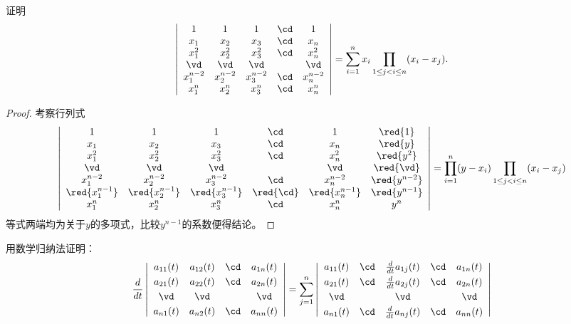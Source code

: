 \begin{li}
  证明
  $$
  \left|
    \begin{array}{ccccc}
      1&1&1&\cd&1\\
      x_1&x_2&x_3&\cd&x_n\\
      x_1^2&x_2^2&x_3^2&\cd&x_n^2\\
      \vd&\vd&\vd&&\vd\\
      x_1^{n-2}&x_2^{n-2}&x_3^{n-2}&\cd&x_n^{n-2}\\
      x_1^{n}&x_2^{n}&x_3^{n}&\cd&x_n^{n}\\
    \end{array}
  \right| = \sum_{i=1}^{n}x_i \prod_{1\le j < i \le n}(x_i-x_j).
  $$
\end{li}

\begin{proof}
考察行列式
$$
\left|
  \begin{array}{cccccc}
    1&1&1&\cd&1&\red{1}\\
    x_1&x_2&x_3&\cd&x_n&\red{y}\\
    x_1^2&x_2^2&x_3^2&\cd&x_n^2&\red{y^2}\\
    \vd&\vd&\vd&&\vd&\red{\vd}\\
    x_1^{n-2}&x_2^{n-2}&x_3^{n-2}&\cd&x_n^{n-2}&\red{y^{n-2}}\\
    \red{x_1^{n-1}}&\red{x_2^{n-1}}&\red{x_3^{n-1}}&\red{\cd}&\red{x_n^{n-1}}&\red{y^{n-1}}\\
    x_1^{n}&x_2^{n}&x_3^{n}&\cd&x_n^{n}&y^n\\
  \end{array}
\right| = \prod_{i=1}^n(y-x_i) \prod_{1\le j < i \le n} (x_i-x_j)
$$
等式两端均为关于$y$的多项式，比较$y^{n-1}$的系数便得结论。


\end{proof}




\begin{li} 
  用数学归纳法证明：
  $$
  \frac{d}{dt} \left|
    \begin{array}{cccc}
      a_{11}(t)&a_{12}(t)&\cd&a_{1n}(t)\\[0.1cm]
      a_{21}(t)&a_{22}(t)&\cd&a_{2n}(t)\\[0.1cm]
      \vd&\vd&&\vd\\[0.1cm]
      a_{n1}(t)&a_{n2}(t)&\cd&a_{nn}(t)
    \end{array}
  \right| = \sum_{j=1}^n\left|
    \begin{array}{ccccc}
      a_{11}(t)&\cd&\frac{d}{dt} a_{1j}(t)&\cd&a_{1n}(t)\\[0.1cm]
      a_{21}(t)&\cd&\frac{d}{dt} a_{2j}(t)&\cd&a_{2n}(t)\\[0.1cm]
      \vd&&\vd&&\vd\\[0.1cm]
      a_{n1}(t)&\cd&\frac{d}{dt} a_{nj}(t)&\cd&a_{nn}(t)
    \end{array}
  \right|
  $$
\end{li}


